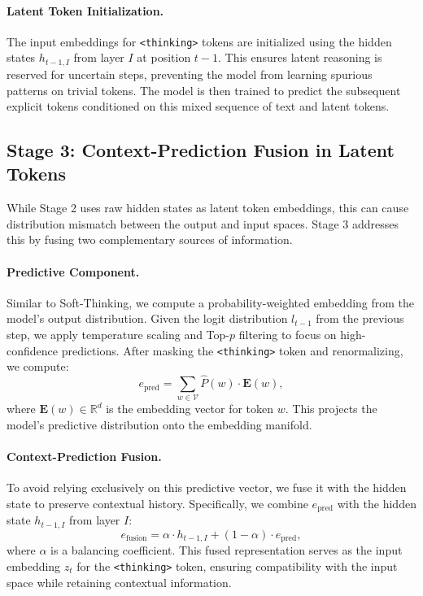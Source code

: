 \documentclass{article}
\theoremstyle{plain}
\theoremstyle{definition}
\theoremstyle{remark}
\begin{document}
\paragraph{Latent Token Initialization.} The input embeddings for \texttt{<thinking>} tokens are initialized using the hidden states $h_{t-1,I}$ from layer $I$ at position $t-1$. This ensures latent reasoning is reserved for uncertain steps, preventing the model from learning spurious patterns on trivial tokens. The model is then trained to predict the subsequent explicit tokens conditioned on this mixed sequence of text and latent tokens.

\subsection{Stage 3: Context-Prediction Fusion in Latent Tokens}

While Stage 2 uses raw hidden states as latent token embeddings, this can cause distribution mismatch between the output and input spaces. Stage 3 addresses this by fusing two complementary sources of information.

\paragraph{Predictive Component.}
Similar to Soft-Thinking, we compute a probability-weighted embedding from the model's output distribution. Given the logit distribution $l_{t-1}$ from the previous step, we apply temperature scaling and Top-$p$ filtering to focus on high-confidence predictions. After masking the \texttt{<thinking>} token and renormalizing, we compute:
\begin{equation}
    e_{\text{pred}} = \sum_{w \in \mathcal{V}} \hat{P}(w) \cdot \mathbf{E}(w),
\end{equation}
where $\mathbf{E}(w) \in \mathbb{R}^d$ is the embedding vector for token $w$. This projects the model's predictive distribution onto the embedding manifold.

\paragraph{Context-Prediction Fusion.}
To avoid relying exclusively on this predictive vector, we fuse it with the hidden state to preserve contextual history. Specifically, we combine $e_{\text{pred}}$ with the hidden state $h_{t-1,I}$ from layer $I$:
\begin{equation}
    e_{\text{fusion}} = \alpha \cdot h_{t-1,I} + (1 - \alpha) \cdot e_{\text{pred}},
\end{equation}
where $\alpha$ is a balancing coefficient. This fused representation serves as the input embedding $z_t$ for the \texttt{<thinking>} token, ensuring compatibility with the input space while retaining contextual information.
\end{document}
